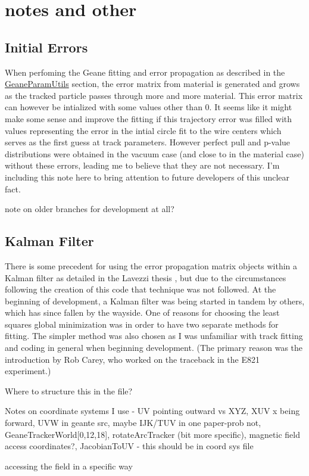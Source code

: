 \section{notes and other}

  \subsection{Initial Errors}

  When perfoming the Geane fitting and error propagation as described in the \hyperref[sec:GeaneParamUtils]{GeaneParamUtils} section, the error matrix from material is generated and grows as the tracked particle passes through more and more material. This error matrix can however be intialized with some values other than 0. It seems like it might make some sense and improve the fitting if this trajectory error was filled with values representing the error in the intial circle fit to the wire centers which serves as the first guess at track parameters. However perfect pull and p-value distributions were obtained in the vacuum case (and close to in the material case) without these errors, leading me to believe that they are not necessary. I'm including this note here to bring attention to future developers of this unclear fact.



  note on older branches for development at all?



  \subsection{Kalman Filter}

    There is some precedent for using the error propagation matrix objects within a Kalman filter as detailed in the Lavezzi thesis \cite{Lavezzi}, but due to the circumstances following the creation of this code that technique was not followed. At the beginning of development, a Kalman filter was being started in tandem by others, which has since fallen by the wayside. One of reasons for choosing the least squares global minimization was in order to have two separate methods for fitting. The simpler method was also chosen as I was unfamiliar with track fitting and coding in general when beginning development. (The primary reason was the introduction by Rob Carey, who worked on the traceback in the E821 experiment.)






Where to structure this in the file?

Notes on coordinate systems I use - UV pointing outward vs XYZ, XUV x being forward, UVW in geante src, maybe IJK/TUV in one paper-prob not, GeaneTrackerWorld[0,12,18], rotateArcTracker (bit more specific), magnetic field access coordinates?, JacobianToUV
- this should be in coord sys file

accessing the field in a specific way

